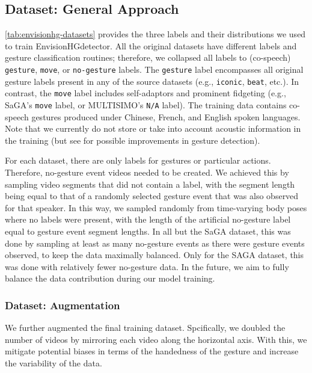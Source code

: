 \documentclass[11pt,smallheadings,cleardoublepage=empty,tocflat,numbers=noenddot,twoside,captions=tableheading]{scrbook}
\begin{document}
\begin{refsection}
\subsection{Dataset: General Approach}
\autoref{tab:envisionhg-datasets} provides the three labels and their distributions we used to train EnvisionHGdetector. All the original datasets have different labels and gesture classification routines; therefore, we collapsed all labels to (co-speech) \texttt{gesture}, \texttt{move}, or \texttt{no-gesture} labels. The \texttt{gesture}
label encompasses all original gesture labels present in any of the source datasets (e.g., \texttt{iconic}, \texttt{beat}, etc.). In contrast, the \texttt{move} label includes self-adaptors and prominent fidgeting (e.g., SaGA's \texttt{move} label, or MULTISIMO's \texttt{N/A} label). The training data contains co-speech gestures produced under Chinese, French, and English spoken languages. Note that we currently do not store or take into account acoustic information in the training (but see \cite{ghalebLeveragingSpeechGesture2024} for possible improvements in gesture detection).

For each dataset, there are only labels for gestures or particular actions. Therefore, no-gesture event videos needed to be created. We achieved this by sampling video segments that did not contain a label, with the segment length being equal to that of a randomly selected gesture event that was also observed for that speaker. In this way, we sampled randomly from time-varying body poses where no labels were present, with the length of the artificial no-gesture label equal to gesture event segment lengths. In all but the SaGA dataset, this was done by sampling at least as many no-gesture events as there were gesture events observed, to keep the data maximally balanced. Only for the SAGA dataset, this was done with relatively fewer no-gesture data. In the future, we aim to fully balance the data contribution during our model training.

\subsubsection{Dataset: Augmentation}
We further augmented the final training dataset. Spcifically, we
doubled the number of videos by mirroring each video along the horizontal axis. With this, we mitigate potential biases in terms of the handedness of the gesture and increase the variability of the data. 


\end{refsection}
\end{document}
